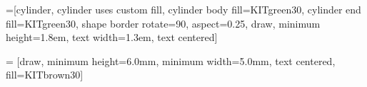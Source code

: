 =[cylinder, cylinder uses custom fill, cylinder body 
		fill=KITgreen30, cylinder end fill=KITgreen30, shape border rotate=90,
		aspect=0.25, draw, minimum height=1.8em, text width=1.3em, text centered]

 = [draw, minimum height=6.0mm, minimum width=5.0mm, 
    text centered, fill=KITbrown30] 



   
    

\makeatletter
{}
\makeatother

